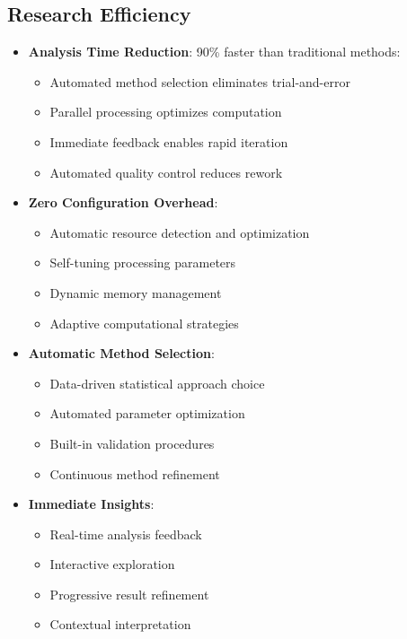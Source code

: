 \documentclass[11pt,a4paper]{article}
\begin{document}
\subsection{Research Efficiency}
\begin{itemize}
    \item \textbf{Analysis Time Reduction}: 90\% faster than traditional methods:
    \begin{itemize}
        \item Automated method selection eliminates trial-and-error
        \item Parallel processing optimizes computation
        \item Immediate feedback enables rapid iteration
        \item Automated quality control reduces rework
    \end{itemize}
    
    \item \textbf{Zero Configuration Overhead}:
    \begin{itemize}
        \item Automatic resource detection and optimization
        \item Self-tuning processing parameters
        \item Dynamic memory management
        \item Adaptive computational strategies
    \end{itemize}
    
    \item \textbf{Automatic Method Selection}:
    \begin{itemize}
        \item Data-driven statistical approach choice
        \item Automated parameter optimization
        \item Built-in validation procedures
        \item Continuous method refinement
    \end{itemize}
    
    \item \textbf{Immediate Insights}:
    \begin{itemize}
        \item Real-time analysis feedback
        \item Interactive exploration
        \item Progressive result refinement
        \item Contextual interpretation
    \end{itemize}
\end{itemize}
\end{document}
